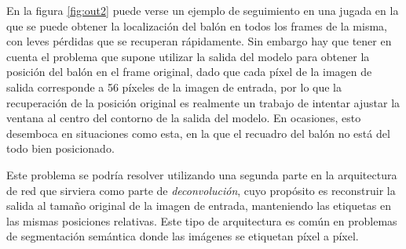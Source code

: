 En la figura \ref{fig:out2} puede verse un ejemplo de seguimiento en una jugada en la que se puede obtener la localización del balón en todos los frames de la misma, con leves pérdidas que se recuperan rápidamente. Sin embargo hay que tener en cuenta el problema que supone utilizar la salida del modelo para obtener la posición del balón en el frame original, dado que cada píxel de la imagen de salida corresponde a 56 píxeles de la imagen de entrada, por lo que la recuperación de la posición original es realmente un trabajo de intentar ajustar la ventana al centro del contorno de la salida del modelo. En ocasiones, esto desemboca en situaciones como esta, en la que el recuadro del balón no está del todo bien posicionado.

Este problema se podría resolver utilizando una segunda parte en la arquitectura de red que sirviera como parte de \textit{deconvolución}, cuyo propósito es reconstruir la salida al tamaño original de la imagen de entrada, manteniendo las etiquetas en las mismas posiciones relativas. Este tipo de arquitectura es común en problemas de segmentación semántica donde las imágenes se etiquetan píxel a píxel.

